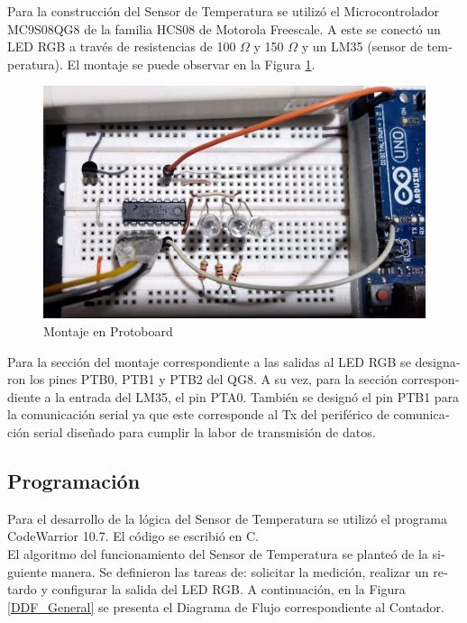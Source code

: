 \documentclass[journal]{IEEEtran}
\begin{document}
\begin{otherlanguage}{spanish}
Para la construcción del Sensor de Temperatura se utilizó el Microcontrolador MC9S08QG8 de la familia HCS08 de Motorola Freescale. A este se conectó un LED RGB a través de resistencias de 100 $\Omega$ y 150 $\Omega$ y un LM35 (sensor de temperatura). El montaje se puede observar en la Figura \ref{M}.

\begin{figure}[H]
    \centering
    \includegraphics[scale=0.3]{Imágenes/Montaje_Practica_5.jpeg}
    \caption{Montaje en Protoboard}
    \label{M}
\end{figure}

Para la sección del montaje correspondiente a las salidas al LED RGB se designaron los pines PTB0, PTB1 y PTB2 del QG8. A su vez, para la sección correspondiente a la entrada del LM35, el pin PTA0. También se designó el pin PTB1 para la comunicación serial ya que este corresponde al Tx del periférico de comunicación serial diseñado para cumplir la labor de transmisión de datos.

\subsection{Programación}

Para el desarrollo de la lógica del Sensor de Temperatura se utilizó el programa CodeWarrior 10.7. El código se escribió en C.\\

El algoritmo del funcionamiento del Sensor de Temperatura se planteó de la siguiente manera. Se definieron las tareas de: solicitar la medición, realizar un retardo y configurar la salida del LED RGB. A continuación, en la Figura \ref{DDF_General} se presenta el Diagrama de Flujo correspondiente al Contador.


\end{otherlanguage}
\end{document}
